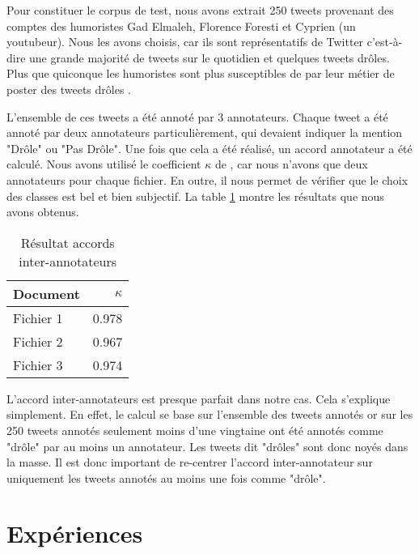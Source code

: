 \documentclass[10pt,a4paper,twoside]{article}
\begin{document}
Pour constituer le corpus de test, nous avons extrait 250 tweets provenant des comptes des humoristes Gad Elmaleh, Florence Foresti et Cyprien (un youtubeur). Nous les avons choisis, car ils sont représentatifs de Twitter c'est-à-dire une grande majorité de tweets sur le quotidien et quelques tweets drôles. Plus que quiconque les humoristes sont plus susceptibles de par leur métier de poster des tweets drôles .

L'ensemble de ces tweets a été annoté par 3 annotateurs. Chaque tweet a été annoté par deux annotateurs particulièrement, qui devaient indiquer la mention "Drôle" ou "Pas Drôle". Une fois que cela a été réalisé, un accord annotateur a été calculé. Nous avons utilisé le coefficient $\kappa$ de \cite{cohen1960}, car nous n'avons que deux annotateurs pour chaque fichier. En outre, il nous permet de vérifier que le choix des classes est bel et bien subjectif. La table \ref{anno} montre les résultats que nous avons obtenus.

\begin{table}[!h]
\centering
	\begin{tabular}{lr}
	\toprule
	 Document & $\kappa$ \\
	\midrule
	  Fichier 1 & 0.978 \\
	  Fichier 2 &  0.967\\
	  Fichier 3 & 0.974  \\
	\bottomrule
	\end{tabular}
\caption{Résultat accords inter-annotateurs}
\label{anno}
\end{table}

L'accord inter-annotateurs est presque parfait dans notre cas. Cela s'explique simplement. En effet, le calcul se base sur l'ensemble des tweets annotés or sur les 250 tweets annotés seulement moins d'une vingtaine ont été annotés comme "drôle" par au moins un annotateur. Les tweets dit "drôles" sont donc noyés dans la masse. Il est donc important de re-centrer l'accord inter-annotateur sur uniquement les tweets annotés au moins une fois comme "drôle". 


\section{Expériences}
\label{eval}
\end{document}
